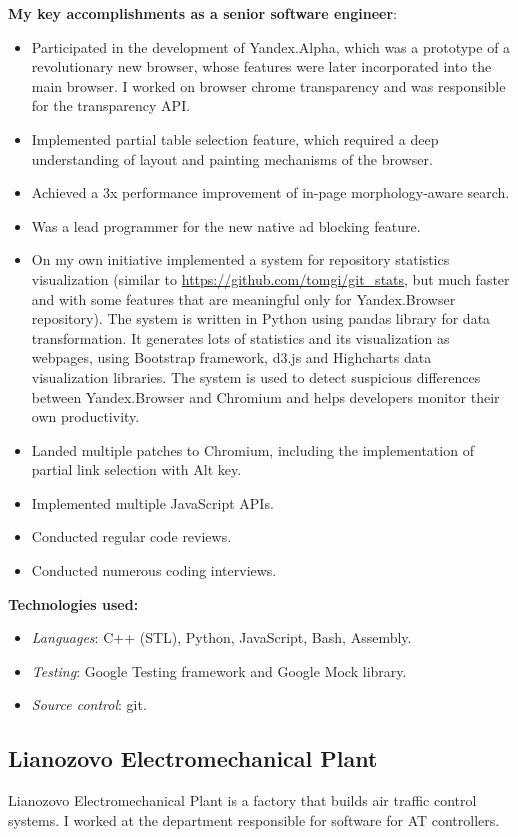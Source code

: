 \documentclass[11pt,a4paper]{moderncv}
\begin{document}
  \medskip
  \textbf{My key accomplishments as a senior software engineer}:
  \smallskip
  \begin{itemize}%
    \item Participated in the development of Yandex.Alpha, which was a prototype of a revolutionary new browser, whose features were later incorporated into the main browser.
      I worked on browser chrome transparency and was responsible for the transparency API.
    \item Implemented partial table selection feature, which required a deep understanding of layout and painting mechanisms of the browser.
    \item Achieved a 3x performance improvement of in-page morphology-aware search.
    \item Was a lead programmer for the new native ad blocking feature.
    \item On my own initiative implemented a system for repository statistics visualization (similar to \url{https://github.com/tomgi/git\_stats}, but much faster and with some features that are meaningful only for Yandex.Browser repository).
      The system is written in Python using pandas library for data transformation. It generates lots of statistics and its visualization as webpages, using Bootstrap framework, d3.js and Highcharts data visualization libraries.
      The system is used to detect suspicious differences between Yandex.Browser and Chromium and helps developers monitor their own productivity.
    \item Landed multiple patches to Chromium, including the implementation of partial link selection with Alt key.
    \item Implemented multiple JavaScript APIs.
    \item Conducted regular code reviews.
    \item Conducted numerous coding interviews.
  \end{itemize}

  \medskip
  \textbf{Technologies used:}
  \smallskip
  \begin{itemize}
    \item \textit{Languages}: C++ (STL), Python, JavaScript, Bash, Assembly.
    \item \textit{Testing}: Google Testing framework and Google Mock library.
    \item \textit{Source control}: git.
  \end{itemize}


\bigskip
\subsection{Lianozovo Electromechanical Plant}
  Lianozovo Electromechanical Plant is a factory that builds air traffic control systems. I worked at the department responsible for software for AT controllers.
\end{document}
